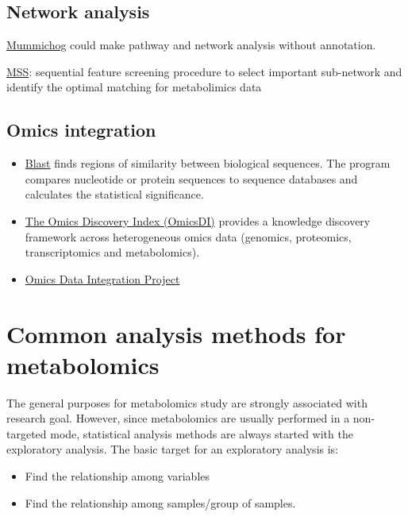 \documentclass[
]{book}
\begin{document}
\hypertarget{network-analysis}{%
\section{Network analysis}\label{network-analysis}}

\href{https://code.google.com/archive/p/atcg/wikis/mummichog_for_metabolomics.wiki}{Mummichog} could make pathway and network analysis without annotation.

\href{http://web1.sph.emory.edu/users/tyu8/MSS}{MSS}: sequential feature screening procedure to select important sub-network and identify the optimal matching for metabolimics data \citep{cai2017}

\hypertarget{omics-integration}{%
\section{Omics integration}\label{omics-integration}}

\begin{itemize}
\item
  \href{https://blast.ncbi.nlm.nih.gov/Blast.cgi}{Blast} finds regions of similarity between biological sequences. The program compares nucleotide or protein sequences to sequence databases and calculates the statistical significance.
\item
  \href{https://www.omicsdi.org/}{The Omics Discovery Index (OmicsDI)} provides a knowledge discovery framework across heterogeneous omics data (genomics, proteomics, transcriptomics and metabolomics).
\item
  \href{https://github.com/cran/mixOmics}{Omics Data Integration Project}
\end{itemize}

\hypertarget{common-analysis-methods-for-metabolomics}{%
\chapter{Common analysis methods for metabolomics}\label{common-analysis-methods-for-metabolomics}}

The general purposes for metabolomics study are strongly associated with research goal. However, since metabolomics are usually performed in a non-targeted mode, statistical analysis methods are always started with the exploratory analysis. The basic target for an exploratory analysis is:

\begin{itemize}
\item
  Find the relationship among variables
\item
  Find the relationship among samples/group of samples.
\end{itemize}
\end{document}
